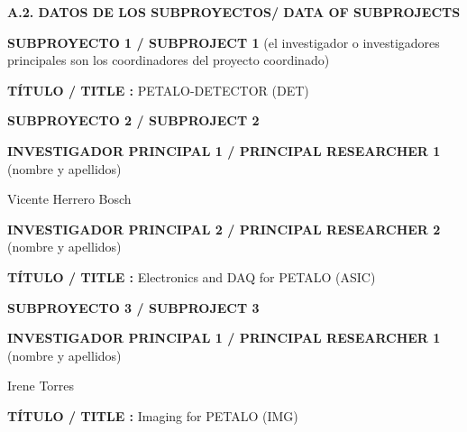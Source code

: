 \documentclass[a4paper,11pt,oneside]{article}
\begin{document}
 \vspace{12pt}


\noindent\textbf{A.2. DATOS DE LOS SUBPROYECTOS/ DATA OF SUBPROJECTS }
 \vspace{12pt}
 
\noindent\textbf{SUBPROYECTO 1 / SUBPROJECT 1} (el investigador o investigadores principales son los coordinadores del proyecto coordinado)

\vspace{6pt}
\noindent\textbf{TÍTULO / TITLE :} PETALO-DETECTOR (DET)
%

 \vspace{12pt}
 
\noindent\textbf{SUBPROYECTO 2 / SUBPROJECT 2}
\vspace{6pt}

\noindent\textbf{INVESTIGADOR PRINCIPAL 1 / PRINCIPAL RESEARCHER 1 } (nombre y apellidos)

\vspace{6pt}
\noindent Vicente Herrero Bosch

\vspace{12pt}
\noindent\textbf{INVESTIGADOR PRINCIPAL 2 / PRINCIPAL RESEARCHER 2} (nombre y apellidos)

\vspace{6pt}


\vspace{6pt}
\noindent\textbf{TÍTULO / TITLE :} Electronics and DAQ for PETALO (ASIC)

\vspace{12pt}
\noindent\textbf{SUBPROYECTO 3 / SUBPROJECT 3}
\vspace{6pt}

\noindent\textbf{INVESTIGADOR PRINCIPAL 1 / PRINCIPAL RESEARCHER 1 } (nombre y apellidos)

\vspace{6pt}
\noindent Irene Torres

\vspace{6pt}
\noindent\textbf{TÍTULO / TITLE :} Imaging for PETALO (IMG)
\end{document}

